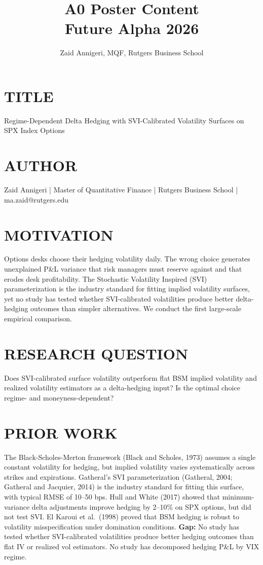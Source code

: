 \documentclass[11pt]{article}
\title{A0 Poster Content\\{\large Future Alpha 2026}}
\author{Zaid Annigeri, MQF, Rutgers Business School}
\date{}
\begin{document}
\maketitle

\section*{TITLE}
Regime-Dependent Delta Hedging with SVI-Calibrated Volatility Surfaces on SPX Index Options

\section*{AUTHOR}
Zaid Annigeri | Master of Quantitative Finance | Rutgers Business School | ma.zaid@rutgers.edu

\section*{MOTIVATION}
Options desks choose their hedging volatility daily. The wrong choice generates unexplained P\&L variance that risk managers must reserve against and that erodes desk profitability. The Stochastic Volatility Inspired (SVI) parameterization is the industry standard for fitting implied volatility surfaces, yet no study has tested whether SVI-calibrated volatilities produce better delta-hedging outcomes than simpler alternatives. We conduct the first large-scale empirical comparison.

\section*{RESEARCH QUESTION}
Does SVI-calibrated surface volatility outperform flat BSM implied volatility and realized volatility estimators as a delta-hedging input? Is the optimal choice regime- and moneyness-dependent?

\section*{PRIOR WORK}
The Black-Scholes-Merton framework (Black and Scholes, 1973) assumes a single constant volatility for hedging, but implied volatility varies systematically across strikes and expirations. Gatheral's SVI parameterization (Gatheral, 2004; Gatheral and Jacquier, 2014) is the industry standard for fitting this surface, with typical RMSE of 10--50 bps. Hull and White (2017) showed that minimum-variance delta adjustments improve hedging by 2--10\% on SPX options, but did not test SVI. El Karoui et al.\ (1998) proved that BSM hedging is robust to volatility misspecification under domination conditions. \textbf{Gap:} No study has tested whether SVI-calibrated volatilities produce better hedging outcomes than flat IV or realized vol estimators. No study has decomposed hedging P\&L by VIX regime.
\end{document}
